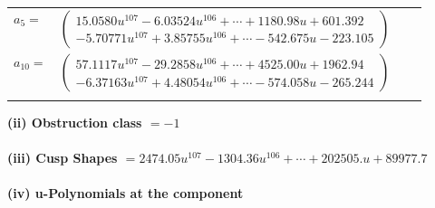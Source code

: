 \documentclass[1p]{elsarticle_modified}
\theoremstyle{definition}
\begin{document}
\begin{tabular}{m{7pt} m{180pt} m{7pt} m{180pt} }
\flushright $a_{5}=$&$\begin{pmatrix}15.0580 u^{107}-6.03524 u^{106}+\cdots+1180.98 u+601.392\\-5.70771 u^{107}+3.85755 u^{106}+\cdots-542.675 u-223.105\end{pmatrix}$ \\
\flushright $a_{10}=$&$\begin{pmatrix}57.1117 u^{107}-29.2858 u^{106}+\cdots+4525.00 u+1962.94\\-6.37163 u^{107}+4.48054 u^{106}+\cdots-574.058 u-265.244\end{pmatrix}$\\&\end{tabular}
\flushleft \textbf{(ii) Obstruction class $= -1$}\\~\\
\flushleft \textbf{(iii) Cusp Shapes $= 2474.05 u^{107}-1304.36 u^{106}+\cdots+202505. u+89977.7$}\\~\\
\newpage\renewcommand{\arraystretch}{1}
\flushleft \textbf{(iv) u-Polynomials at the component}\newline \\
\end{document}
